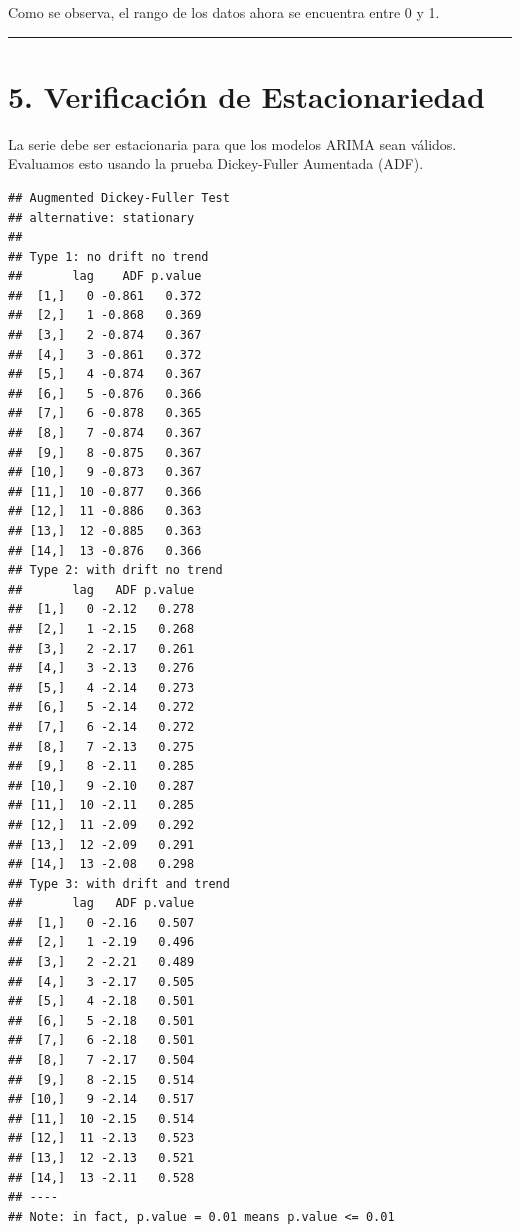 \documentclass[
]{book}
\begin{document}
Como se observa, el rango de los datos ahora se encuentra entre 0 y 1.

\begin{center}\rule{0.5\linewidth}{0.5pt}\end{center}

\section{5. Verificación de Estacionariedad}\label{verificaciuxf3n-de-estacionariedad}

La serie debe ser estacionaria para que los modelos ARIMA sean válidos. Evaluamos esto usando la prueba Dickey-Fuller Aumentada (ADF).

\begin{verbatim}
## Augmented Dickey-Fuller Test 
## alternative: stationary 
##  
## Type 1: no drift no trend 
##       lag    ADF p.value
##  [1,]   0 -0.861   0.372
##  [2,]   1 -0.868   0.369
##  [3,]   2 -0.874   0.367
##  [4,]   3 -0.861   0.372
##  [5,]   4 -0.874   0.367
##  [6,]   5 -0.876   0.366
##  [7,]   6 -0.878   0.365
##  [8,]   7 -0.874   0.367
##  [9,]   8 -0.875   0.367
## [10,]   9 -0.873   0.367
## [11,]  10 -0.877   0.366
## [12,]  11 -0.886   0.363
## [13,]  12 -0.885   0.363
## [14,]  13 -0.876   0.366
## Type 2: with drift no trend 
##       lag   ADF p.value
##  [1,]   0 -2.12   0.278
##  [2,]   1 -2.15   0.268
##  [3,]   2 -2.17   0.261
##  [4,]   3 -2.13   0.276
##  [5,]   4 -2.14   0.273
##  [6,]   5 -2.14   0.272
##  [7,]   6 -2.14   0.272
##  [8,]   7 -2.13   0.275
##  [9,]   8 -2.11   0.285
## [10,]   9 -2.10   0.287
## [11,]  10 -2.11   0.285
## [12,]  11 -2.09   0.292
## [13,]  12 -2.09   0.291
## [14,]  13 -2.08   0.298
## Type 3: with drift and trend 
##       lag   ADF p.value
##  [1,]   0 -2.16   0.507
##  [2,]   1 -2.19   0.496
##  [3,]   2 -2.21   0.489
##  [4,]   3 -2.17   0.505
##  [5,]   4 -2.18   0.501
##  [6,]   5 -2.18   0.501
##  [7,]   6 -2.18   0.501
##  [8,]   7 -2.17   0.504
##  [9,]   8 -2.15   0.514
## [10,]   9 -2.14   0.517
## [11,]  10 -2.15   0.514
## [12,]  11 -2.13   0.523
## [13,]  12 -2.13   0.521
## [14,]  13 -2.11   0.528
## ---- 
## Note: in fact, p.value = 0.01 means p.value <= 0.01
\end{verbatim}
\end{document}
